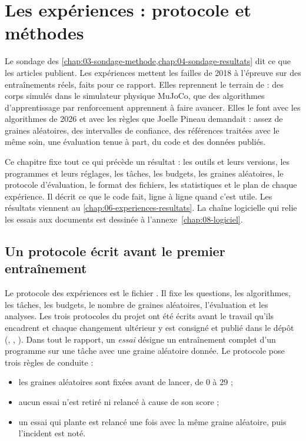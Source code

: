 \chapter{Les expériences : protocole et méthodes}\label{chap:05-experiences-methode}

Le sondage des \cref{chap:03-sondage-methode,chap:04-sondage-resultats} dit ce que les articles publient. Les
expériences mettent les failles de 2018 à l'épreuve sur des entraînements réels, faits pour ce rapport. Elles
reprennent le terrain de \textcite{henderson2018matters} : des corps simulés dans le simulateur physique MuJoCo,
que des algorithmes d'apprentissage par renforcement apprennent à faire avancer. Elles le font avec les
algorithmes de 2026 et avec les règles que Joelle Pineau demandait : assez de graines aléatoires, des
intervalles de confiance, des références traitées avec le même soin, une évaluation tenue à part, du code et
des données publiés.

Ce chapitre fixe tout ce qui précède un résultat : les outils et leurs versions, les programmes et leurs
réglages, les tâches, les budgets, les graines aléatoires, le protocole d'évaluation, le format des fichiers,
les statistiques et le plan de chaque expérience. Il décrit ce que le code fait, ligne à ligne quand c'est
utile. Les résultats viennent au
\cref{chap:06-experiences-resultats}. La chaîne logicielle qui relie les essais aux documents est dessinée à
l'annexe~\ref{chap:08-logiciel}.

\section{Un protocole écrit avant le premier entraînement}\label{sec:protocole}

Le protocole des expériences est le fichier . Il fixe les questions, les
algorithmes, les tâches, les budgets, le nombre de graines aléatoires, l'évaluation et les analyses. Les
trois protocoles du projet ont été écrits avant le travail qu'ils encadrent et chaque changement ultérieur y
est consigné et publié dans le dépôt (, ,
). Dans tout le rapport, un
\emph{essai} désigne un entraînement complet d'un programme sur une tâche avec une graine aléatoire donnée. Le
protocole pose trois règles de conduite :
\begin{itemize}
  \item les graines aléatoires sont fixées avant de lancer, de 0 à 29 ;
  \item aucun essai n'est retiré ni relancé à cause de son score ;
  \item un essai qui plante est relancé une fois avec la même graine aléatoire, puis l'incident est noté.
\end{itemize}

